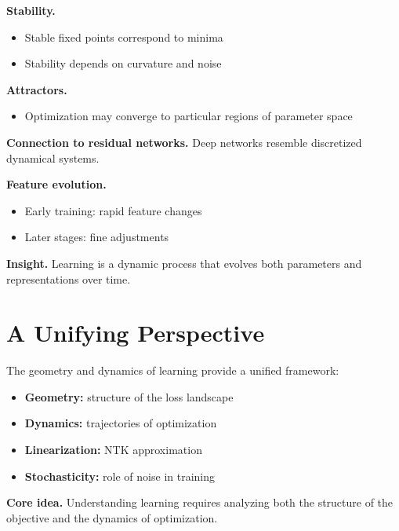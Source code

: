 \medskip

\noindent
\textbf{Stability.}
\begin{itemize}
    \item Stable fixed points correspond to minima
    \item Stability depends on curvature and noise
\end{itemize}

\medskip

\noindent
\textbf{Attractors.}
\begin{itemize}
    \item Optimization may converge to particular regions of parameter space
\end{itemize}

\medskip

\noindent
\textbf{Connection to residual networks.}  
Deep networks resemble discretized dynamical systems.

\medskip

\noindent
\textbf{Feature evolution.}
\begin{itemize}
    \item Early training: rapid feature changes
    \item Later stages: fine adjustments
\end{itemize}

\medskip

\noindent
\textbf{Insight.}  
Learning is a dynamic process that evolves both parameters and representations over time.

\section{A Unifying Perspective}

The geometry and dynamics of learning provide a unified framework:

\begin{itemize}
    \item \textbf{Geometry:} structure of the loss landscape
    \item \textbf{Dynamics:} trajectories of optimization
    \item \textbf{Linearization:} NTK approximation
    \item \textbf{Stochasticity:} role of noise in training
\end{itemize}

\medskip

\noindent
\textbf{Core idea.}  
Understanding learning requires analyzing both the structure of the objective and the dynamics of optimization.

